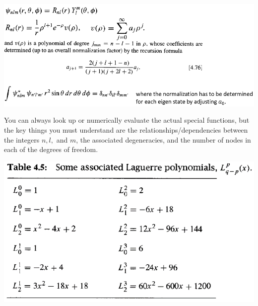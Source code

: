 \documentclass{article}
\begin{document}
\includegraphics[width = 0.9 \textwidth]{Lecture20/5.png}

You can always look up or numerically evaluate the actual special functions, but the key things you must understand are the relationships/dependencies between the integers $n, l,$ and $m$, the associated degeneracies, and the number of nodes in each of the degrees of freedom. 

\includegraphics[width = 0.5 \textwidth]{Lecture20/6.png}
\end{document}

